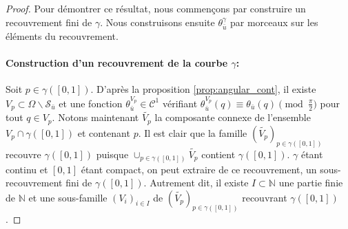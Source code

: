 \begin{proof}
    Pour démontrer ce résultat, nous commençons par construire un recouvrement fini de $\gamma$. Nous construisons ensuite $\theta_{\bar{u}}^\gamma$ par morceaux sur les éléments du recouvrement.

    \paragraph{Construction d'un recouvrement de la courbe $\gamma$:} Soit $p\in\gamma([0, 1])$. D'après la proposition \ref{prop:angular_cont}, il existe $V_p\subset\Omega\backslash\mathcal{S}_{\bar{u}}$ et une fonction $\theta_{\bar{u}}^{V_p}\in\mathcal{C}^1$ vérifiant $\theta_{\bar{u}}^{V_p}(q)\equiv\theta_{\bar{u}}(q)\pmod{\frac{\pi}{2}}$ pour tout $q\in V_p$. Notons maintenant $\widetilde{V_p}$ la composante connexe de l'ensemble $V_p\cap\gamma([0, 1])$ et contenant $p$. Il est clair que la famille $(\widetilde{V_p})_{p\in\gamma([0, 1])}$ recouvre $\gamma([0, 1])$ puisque $\displaystyle\cup_{p\in\gamma([0, 1])}\widetilde{V_p}$ contient $\gamma([0, 1])$. $\gamma$ étant continu et $[0, 1]$ étant compact, on peut extraire de ce recouvrement, un sous-recouvrement fini de $\gamma([0, 1])$. Autrement dit, il existe $I\subset\mathbb{N}$ une partie finie de $\mathbb{N}$ et une sous-famille $(V_i)_{i\in I}$ de $(\widetilde{V_p})_{p\in\gamma([0, 1])}$ recouvrant $\gamma([0, 1])$.


\end{proof}
